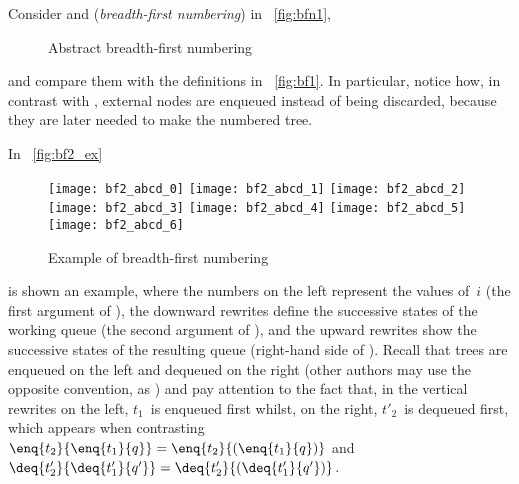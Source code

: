 Consider  and
(\emph{breadth\hyp{}first numbering}) in \fig~\vref{fig:bfn1},
\begin{figure}
\abovedisplayskip=0pt
\belowdisplayskip=0pt
\centering
{}
\caption{Abstract breadth-first numbering}
\label{fig:bfn1}
\end{figure}
and compare them with the definitions in \fig~\vref{fig:bf1}. In
particular, notice how, in contrast with
, external nodes are
enqueued instead of being discarded, because they are later needed to
make the numbered tree.

In \fig~\vref{fig:bf2_ex}
\begin{figure}[t]
\centering
\texttt{[image: bf2\_abcd\_0]}
\texttt{[image: bf2\_abcd\_1]}
\texttt{[image: bf2\_abcd\_2]}
\texttt{[image: bf2\_abcd\_3]}
\texttt{[image: bf2\_abcd\_4]}
\texttt{[image: bf2\_abcd\_5]}
\texttt{[image: bf2\_abcd\_6]}
\caption{Example of breadth-first numbering}
\label{fig:bf2_ex}
\end{figure}
is shown an example, where the numbers on the left represent the
values of~\(i\) (the first argument of
), the downward rewrites
define the successive states of the working queue (the second argument
of ), and the upward
rewrites show the successive states of the resulting queue
(right\hyp{}hand side of
). Recall that trees are
enqueued on the left and dequeued on the right (other authors may use
the opposite convention, as \cite{Okasaki_2000}) and pay attention to
the fact that, in the vertical rewrites on the left, \(t_1\)~is
enqueued first whilst, on the right, \(t'_2\)~is dequeued first, which
appears when contrasting \(\enq{t_2}{\enq{t_1}{q}} =
\enq{t_2}{(\enq{t_1}{q})}\) and
\(\deq{t'_2}{\deq{t'_1}{q'}} =
\deq{t'_2}{(\deq{t'_1}{q'})}\).


